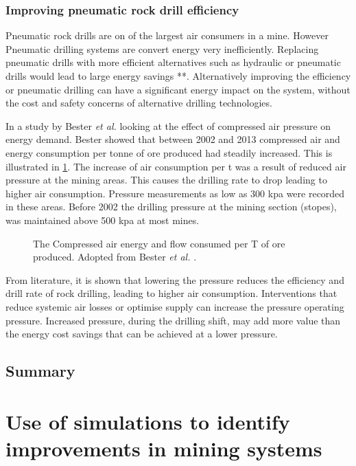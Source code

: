		\subsubsection{Improving pneumatic rock drill efficiency}
		 Pneumatic rock drills are on of the largest air consumers in a mine. However Pneumatic drilling systems are convert energy very inefficiently. Replacing pneumatic drills with more efficient alternatives such as hydraulic or pneumatic drills would lead to large energy savings \cite{Pascoe2016Masters}**.  Alternatively improving the efficiency or pneumatic drilling can have a significant energy impact on the system, without the cost and safety concerns of alternative drilling technologies.
		 \par 
		  In a study by  Bester \textit{et al.} \cite{bester2013effect} looking at the effect of compressed air pressure on energy demand. Bester showed that between 2002 and 2013 compressed air and energy consumption per tonne of ore produced had steadily increased. This is illustrated  in \cref{fig: Compressed energy and air flow per ton}. 
		 The increase of air consumption per \gls{t} was a result of reduced air pressure at the mining areas. This causes the drilling rate to drop leading to higher air consumption. Pressure measurements as low as 300 \gls{kpa} were recorded in these areas. Before 2002 the drilling pressure at the mining section (stopes), was maintained above 500 \gls{kpa} at most mines. 
		 \par 
		 \begin{figure}[h]
		 	\centering
		 	
		 	\caption[The Compressed air energy and flow consumed per T of ore produced.]{The Compressed air energy and flow consumed per T of ore produced. Adopted from Bester \textit{et al.} \cite{bester2013effect}.}
		 	\label{fig: Compressed energy and air flow per ton}
		 \end{figure}
		 From literature, it is shown that lowering the pressure reduces the efficiency and drill rate of rock drilling, leading to higher air consumption. Interventions that reduce systemic air losses or optimise supply can increase the pressure operating pressure. Increased pressure, during the drilling shift, may add more value than the energy cost savings that can be achieved at a lower pressure.
	\subsection{Summary}
\clearpage

\section{Use of simulations to identify improvements in mining systems}
